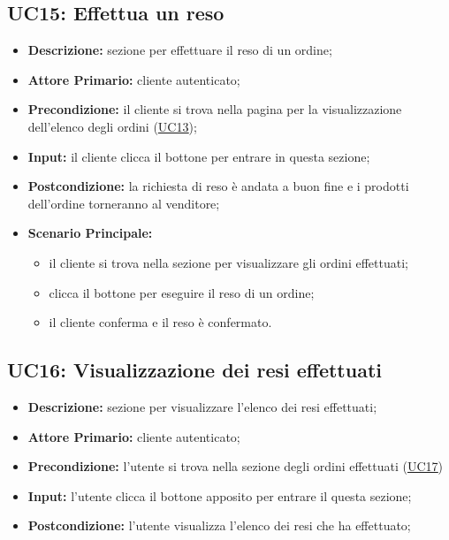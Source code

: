         \subsection{UC15: Effettua un reso}
        \label{sec:UC15}
        \begin{itemize}
            \item \textbf{Descrizione:} sezione per effettuare il reso di un ordine;
            \item \textbf{Attore Primario:} cliente autenticato;
            \item \textbf{Precondizione:} il cliente si trova nella pagina per la visualizzazione dell'elenco degli ordini (\hyperref[sec:UC13]{\underline{UC13}});
            \item \textbf{Input:} il cliente clicca il bottone per entrare in questa sezione;
            \item \textbf{Postcondizione:} la richiesta di reso è andata a buon fine e i prodotti dell'ordine torneranno al venditore;
            \item \textbf{Scenario Principale:}
                \begin{itemize}
                    \item il cliente si trova nella sezione per visualizzare gli ordini effettuati;
                    \item clicca il bottone per eseguire il reso di un ordine;
                    \item il cliente conferma e il reso è confermato.
                \end{itemize}
        \end{itemize}

        \subsection{UC16: Visualizzazione dei resi effettuati}
        \label{sec:UC16}
        \begin{itemize}
            \item \textbf{Descrizione:} sezione per visualizzare l'elenco dei resi effettuati;
            \item \textbf{Attore Primario:} cliente autenticato;
            \item \textbf{Precondizione:} l'utente si trova nella sezione degli ordini effettuati (\hyperref[sec:UC17]{\underline{UC17}})
            \item \textbf{Input:} l'utente clicca il bottone apposito per entrare il questa sezione;
            \item \textbf{Postcondizione:} l'utente visualizza l'elenco dei resi che ha effettuato;
        \end{itemize}
